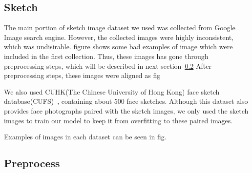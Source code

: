 \subsection{Sketch}

The main portion of sketch image dataset we used was collected from Google Image search engine. However, the collected images were highly inconsistent, which was undisirable. 
figure %
shows some bad examples of image which were included in the first collection. Thus, these images has gone through preprocessing steps, which will be described in next section~\ref{preprocess}
After preprocessing steps, these images were aligned as fig%

We also used CUHK(The Chinese University of Hong Kong) face sketch database(CUFS)~\cite{CUHK_faces}, containing about 500 face sketches. 
Although this dataset also provides face photographs paired with the sketch images, we only used the sketch images to train our model to keep it from overfitting to these paired images.

Examples of images in each dataset can be seen in fig.%

\subsection{Preprocess}\label{preprocess}

